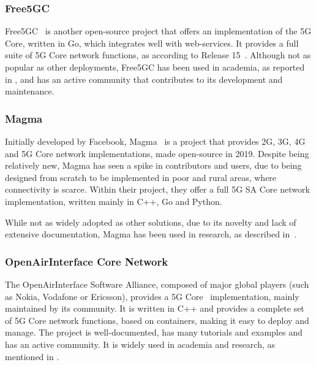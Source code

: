 \subsubsection{Free5GC}
\label{sec:free5gc}

Free5GC~\cite{free5gc_repo} is another open-source project that offers an implementation of the 5G Core, written in Go, which integrates well with web-services. It provides a full suite of 5G Core network functions, as according to  Release 15~\cite{3GPPRelease15}. Although not as popular as other deployments, Free5GC has been used in academia, as reported in \cite{horstmann2025open5gcube}, and has an active community that contributes to its development and maintenance.

\subsubsection{Magma}
\label{sec:magma}

Initially developed by Facebook, Magma~\cite{magma_repo} is a project that provides 2G, 3G, 4G and 5G Core network implementations, made open-source in 2019. Despite being relatively new, Magma has seen a spike in contributors and users, due to being designed from scratch to be implemented in poor and rural areas, where connectivity is scarce. Within their project, they offer a full 5G \gls{SA} Core network implementation, written mainly in C++, Go and Python.

While not as widely adopted as other solutions, due to its novelty and lack of extensive documentation, Magma has been used in research, as described in~\cite{hasan2023building}.

\subsubsection{OpenAirInterface Core Network}
\label{sec:openairinterface}

The OpenAirInterface Software Alliance, composed of major global players (such as Nokia, Vodafone or Ericsson), provides a 5G Core~\cite{oai_core_repo} implementation, mainly maintained by its community. It is written in C++ and provides a complete set of 5G Core network functions, based on containers, making it easy to deploy and manage. The project is well-documented, has many tutorials and examples and has an active community. It is widely used in academia and research, as mentioned in \cites{bonati2025_5gct}{horstmann2025open5gcube}{vazquez2024maq5g}.


